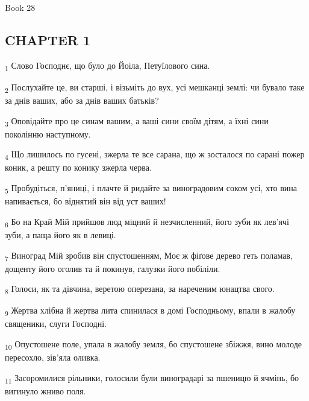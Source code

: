Book 28
\subsection{CHAPTER 1}
\begin{tcolorbox}
\textsubscript{1} Слово Господнє, що було до Йоіла, Петуїлового сина.
\end{tcolorbox}
\begin{tcolorbox}
\textsubscript{2} Послухайте це, ви старші, і візьміть до вух, усі мешканці землі: чи бувало таке за днів ваших, або за днів ваших батьків?
\end{tcolorbox}
\begin{tcolorbox}
\textsubscript{3} Оповідайте про це синам вашим, а ваші сини своїм дітям, а їхні сини поколінню наступному.
\end{tcolorbox}
\begin{tcolorbox}
\textsubscript{4} Що лишилось по гусені, зжерла те все сарана, що ж зосталося по сарані пожер коник, а решту по конику зжерла черва.
\end{tcolorbox}
\begin{tcolorbox}
\textsubscript{5} Пробудіться, п'яниці, і плачте й ридайте за виноградовим соком усі, хто вина напивається, бо віднятий він від уст ваших!
\end{tcolorbox}
\begin{tcolorbox}
\textsubscript{6} Бо на Край Мій прийшов люд міцний й незчисленний, його зуби як лев'ячі зуби, а паща його як в левиці.
\end{tcolorbox}
\begin{tcolorbox}
\textsubscript{7} Виноград Мій зробив він спустошенням, Моє ж фіґове дерево геть поламав, дощенту його оголив та й покинув, галузки його побіліли.
\end{tcolorbox}
\begin{tcolorbox}
\textsubscript{8} Голоси, як та дівчина, веретою оперезана, за нареченим юнацтва свого.
\end{tcolorbox}
\begin{tcolorbox}
\textsubscript{9} Жертва хлібна й жертва лита спинилася в домі Господньому, впали в жалобу священики, слуги Господні.
\end{tcolorbox}
\begin{tcolorbox}
\textsubscript{10} Опустошене поле, упала в жалобу земля, бо спустошене збіжжя, вино молоде пересохло, зів'яла оливка.
\end{tcolorbox}
\begin{tcolorbox}
\textsubscript{11} Засоромилися рільники, голосили були виноградарі за пшеницю й ячмінь, бо вигинуло жниво поля.
\end{tcolorbox}
